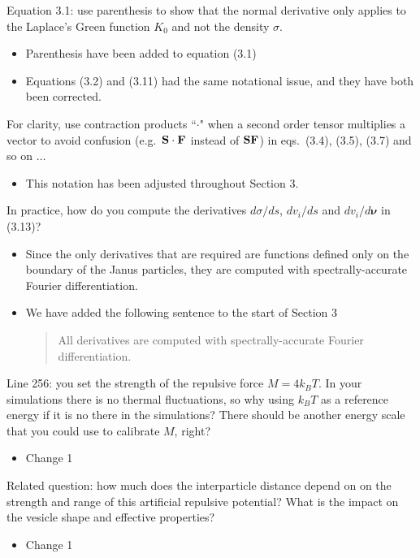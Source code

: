\documentclass[11pt]{article}
\newcommand{\comment}[1]{{\color{blue} #1}}
\begin{document}
\noindent
\comment{Equation 3.1: use parenthesis to show that the normal
derivative only applies to the Laplace’s Green function $K_0$ and not
the density $\sigma$.}
\begin{itemize}
  \item Parenthesis have been added to equation (3.1) 

  \item Equations (3.2) and (3.11) had the same notational issue, and
    they have both been corrected.
\end{itemize}

\noindent
\comment{For clarity, use contraction products ``$\cdot$" when a second
order tensor multiplies a vector to avoid confusion (e.g.~${\bf S} \cdot
{\bf F}$ instead of ${\bf SF}$) in eqs.~(3.4), (3.5), (3.7) and so on
$\ldots$}
\begin{itemize}
  \item This notation has been adjusted throughout Section 3.
\end{itemize}

\noindent
\comment{In practice, how do you compute the derivatives $d\sigma /ds$,
$dv_i/ds$ and $dv_i/d\boldsymbol{\nu}$ in (3.13)?}
\begin{itemize}
  \item Since the only derivatives that are required are functions
    defined only on the boundary of the Janus particles, they are
    computed with spectrally-accurate Fourier differentiation.

  \item We have added the following sentence to the start of Section 3
    \begin{quotation}
      All derivatives are computed with spectrally-accurate Fourier
      differentiation.
    \end{quotation}
\end{itemize}

\noindent
\comment{Line 256: you set the strength of the repulsive force $M = 4k_B
T$. In your simulations there is no thermal fluctuations, so why using
$k_B T$ as a reference energy if it is no there in the simulations?
There should be another energy scale that you could use to calibrate
$M$, right?}
\begin{itemize}
  \item Change 1 
\end{itemize}

\noindent
\comment{Related question: how much does the interparticle distance
depend on on the strength and range of this artificial repulsive
potential? What is the impact on the vesicle shape and effective
properties?}
\begin{itemize}
  \item Change 1 
\end{itemize}
\end{document}
